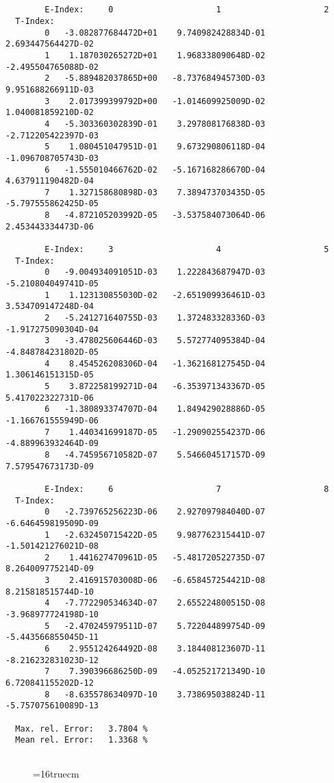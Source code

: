 \documentclass[12pt]{article}
\begin{document}
\begin{small}\begin{verbatim}


        E-Index:     0                     1                     2
  T-Index:
        0   -3.082877684472D+01    9.740982428834D-01    2.693447564427D-02
        1    1.187030265272D+01    1.968338090648D-02   -2.495504765088D-02
        2   -5.889482037865D+00   -8.737684945730D-03    9.951688266911D-03
        3    2.017399399792D+00   -1.014609925009D-02    1.040081859210D-02
        4   -5.303360302839D-01    3.297808176838D-03   -2.712205422397D-03
        5    1.080451047951D-01    9.673290806118D-04   -1.096708705743D-03
        6   -1.555010466762D-02   -5.167168286670D-04    4.637911190482D-04
        7    1.327158680898D-03    7.389473703435D-05   -5.797555862425D-05
        8   -4.872105203992D-05   -3.537584073064D-06    2.453443334473D-06

        E-Index:     3                     4                     5
  T-Index:
        0   -9.004934091051D-03    1.222843687947D-03   -5.210804049741D-05
        1    1.123130855030D-02   -2.651909936461D-03    3.534709147248D-04
        2   -5.241271640755D-03    1.372483328336D-03   -1.917275090304D-04
        3   -3.478025606446D-03    5.572774095384D-04   -4.848784231802D-05
        4    8.454526208306D-04   -1.362168127545D-04    1.306146151315D-05
        5    3.872258199271D-04   -6.353971343367D-05    5.417022322731D-06
        6   -1.380893374707D-04    1.849429028886D-05   -1.166761555949D-06
        7    1.440341699187D-05   -1.290902554237D-06   -4.889963932464D-09
        8   -4.745956710582D-07    5.546604517157D-09    7.579547673173D-09

        E-Index:     6                     7                     8
  T-Index:
        0   -2.739765256223D-06    2.927097984040D-07   -6.646459819509D-09
        1   -2.632450715422D-05    9.987762315441D-07   -1.501421276021D-08
        2    1.441627470961D-05   -5.481720522735D-07    8.264009775214D-09
        3    2.416915703008D-06   -6.658457254421D-08    8.215818515744D-10
        4   -7.772290534634D-07    2.655224800515D-08   -3.968977724198D-10
        5   -2.470245979511D-07    5.722044899754D-09   -5.443566855045D-11
        6    2.955124264492D-08    3.184408123607D-11   -8.216232831023D-12
        7    7.390396686250D-09   -4.052521721349D-10    6.720841155202D-12
        8   -8.635578634097D-10    3.738695038824D-11   -5.757075610089D-13

  Max. rel. Error:   3.7804 %
  Mean rel. Error:   1.3368 %


\end{verbatim}\end{small}
\begin{figure} \label{2.1.5a}
\epsfxsize=16truecm
\end{figure}
\end{document}
